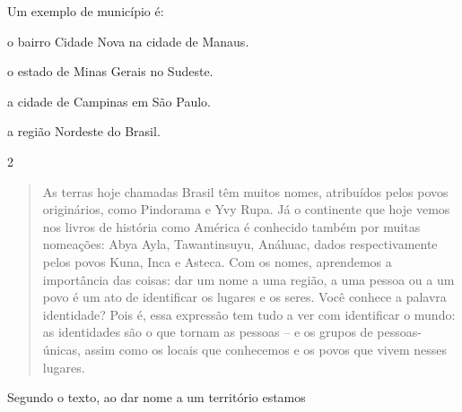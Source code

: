 Um exemplo de município é:

\begin{escolha}
\item o bairro Cidade Nova na cidade de Manaus.

\item o estado de Minas Gerais no Sudeste.

\item a cidade de Campinas em São Paulo.

\item a região Nordeste do Brasil.
\end{escolha}


\num{2}

\begin{quote}
As terras hoje chamadas Brasil têm muitos nomes, atribuídos pelos
povos originários, como Pindorama e Yvy Rupa. Já o continente que hoje
vemos nos livros de história como América é conhecido também por muitas
nomeações: Abya Ayla, Tawantinsuyu, Anáhuac, dados respectivamente pelos
povos Kuna, Inca e Asteca. Com os nomes, aprendemos a importância das
coisas: dar um nome a uma região, a uma pessoa ou a um povo é um ato de
identificar os lugares e os seres. Você conhece a palavra identidade?
Pois é, essa expressão tem tudo a ver com identificar o mundo: as
identidades são o que tornam as pessoas -- e os grupos de pessoas-
únicas, assim como os locais que conhecemos e os povos que vivem nesses
lugares.

\end{quote}

Segundo o texto, ao dar nome a um território estamos

